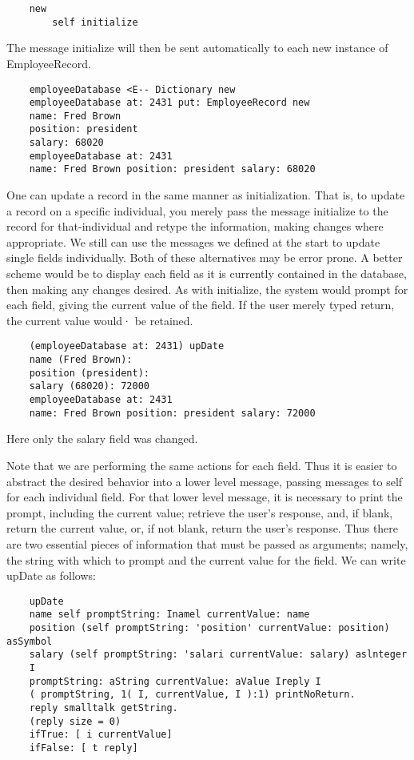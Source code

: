 \begin{lstlisting}
    new
        self initialize
\end{lstlisting}

The message initialize will then be sent automatically to each new instance
of EmployeeRecord.

\begin{lstlisting}
    employeeDatabase <E-- Dictionary new
    employeeDatabase at: 2431 put: EmployeeRecord new
    name: Fred Brown
    position: president
    salary: 68020
    employeeDatabase at: 2431
    name: Fred Brown position: president salary: 68020
\end{lstlisting}

One can update a record in the same manner as initialization. That is,
to update a record on a specific individual, you merely pass the message
initialize to the record for that-individual and retype the information, making changes where appropriate. We still can use the messages we defined
at the start to update single fields individually. Both of these alternatives
may be error prone. A better scheme would be to display each field as it
is currently contained in the database, then making any changes desired.
As with initialize, the system would prompt for each field, giving the current
value of the field. If the user merely typed return, the current value would·
be retained.

\begin{lstlisting}
    (employeeDatabase at: 2431) upDate
    name (Fred Brown):
    position (president):
    salary (68020): 72000
    employeeDatabase at: 2431
    name: Fred Brown position: president salary: 72000
\end{lstlisting}

\noindent
Here only the salary field was changed.

Note that we are performing the same actions for each field. Thus it
is easier to abstract the desired behavior into a lower level message, passing
messages to self for each individual field. For that lower level message, it
is necessary to print the prompt, including the current value; retrieve the
user's response, and, if blank, return the current value, or, if not blank,
return the user's response. Thus there are two essential pieces of information that must be passed as arguments; namely, the string with which
to prompt and the current value for the field. We can write upDate as
follows:

\begin{lstlisting}
    upDate
    name self promptString: Inamel currentValue: name
    position (self promptString: 'position' currentValue: position) asSymbol
    salary (self promptString: 'salari currentValue: salary) aslnteger
    I
    promptString: aString currentValue: aValue Ireply I
    ( promptString, 1( I, currentValue, I ):1) printNoReturn.
    reply smalltalk getString.
    (reply size = 0)
    ifTrue: [ i currentValue]
    ifFalse: [ t reply]
\end{lstlisting}

